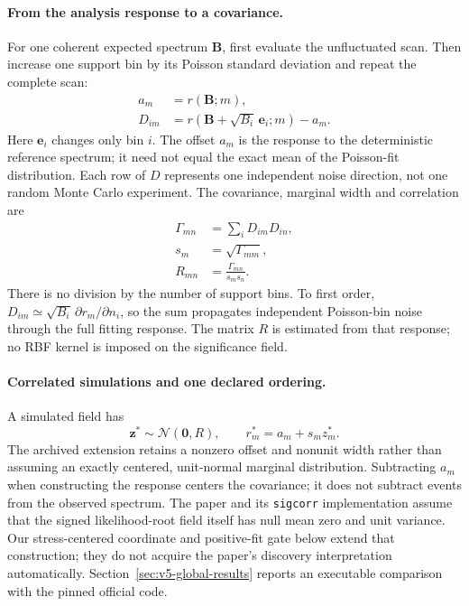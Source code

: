 \paragraph{From the analysis response to a covariance.}
For one coherent expected spectrum $\bm B$, first evaluate the unfluctuated
scan. Then increase one support bin by its Poisson standard deviation and
repeat the complete scan:
\begin{align}
 a_m&=r(\bm B;m),\\
 D_{im}&=r(\bm B+\sqrt{B_i}\,\bm e_i;m)-a_m.
 \label{eq:v501-response-directions}
\end{align}
Here $\bm e_i$ changes only bin $i$. The offset $a_m$ is the response to
the deterministic reference spectrum; it need not equal the exact mean
of the Poisson-fit distribution. Each row of $D$ represents one
independent noise direction, not one random Monte Carlo experiment.
The covariance, marginal width and correlation are
\begin{align}
 \Gamma_{mn}&=\sum_i D_{im}D_{in},
 \label{v5-eq:field-response}\\
 s_m&=\sqrt{\Gamma_{mm}},\\
 R_{mn}&=\frac{\Gamma_{mn}}{s_ms_n}.
 \label{eq:v501-field-correlation}
\end{align}
There is no division by the number of support bins. To first order,
$D_{im}\simeq\sqrt{B_i}\,\partial r_m/\partial n_i$, so the sum propagates
independent Poisson-bin noise through the full fitting response. The
matrix $R$ is estimated from that response; no RBF kernel is imposed on
the significance field.

\paragraph{Correlated simulations and one declared ordering.}
A simulated field has
\begin{equation}
 \bm z^*\sim\mathcal N(\bm0,R),\qquad
 r_m^*=a_m+s_m z_m^*.
 \label{eq:v501-field-draw}
\end{equation}
The archived extension retains a nonzero offset and nonunit width rather
than assuming an exactly centered, unit-normal marginal distribution.
Subtracting $a_m$ when constructing the response centers the covariance;
it does not subtract events from the observed spectrum.
The paper and its \texttt{sigcorr} implementation assume that the signed
likelihood-root field itself has null mean zero and unit variance.
Our stress-centered coordinate and positive-fit gate below extend that
construction; they do not acquire the paper's discovery interpretation
automatically. Section~\ref{sec:v5-global-results} reports an executable
comparison with the pinned official code.

